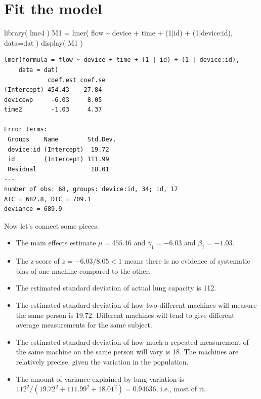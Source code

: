 \documentclass[
  letterpaper,
  DIV=11,
  numbers=noendperiod]{scrreprt}
\newenvironment{Shaded}{\begin{snugshade}}{\end{snugshade}}
\newcommand{\AttributeTok}[1]{\textcolor[rgb]{0.49,0.56,0.16}{#1}}
\newcommand{\DecValTok}[1]{\textcolor[rgb]{0.25,0.63,0.44}{#1}}
\newcommand{\FunctionTok}[1]{\textcolor[rgb]{0.02,0.16,0.49}{#1}}
\newcommand{\NormalTok}[1]{\textcolor[rgb]{0.00,0.44,0.13}{#1}}
\newcommand{\OtherTok}[1]{\textcolor[rgb]{0.00,0.44,0.13}{#1}}
\newcommand{\SpecialCharTok}[1]{\textcolor[rgb]{0.25,0.44,0.63}{#1}}
\providecommand{\tightlist}{%
  \setlength{\itemsep}{0pt}\setlength{\parskip}{0pt}}\usepackage{longtable,booktabs,array}
\begin{document}
\hypertarget{fit-the-model}{%
\section{Fit the model}\label{fit-the-model}}

\begin{Shaded}
\begin{Highlighting}[]
\FunctionTok{library}\NormalTok{( lme4 )}
\NormalTok{M1 }\OtherTok{=} \FunctionTok{lmer}\NormalTok{( flow }\SpecialCharTok{\textasciitilde{}}\NormalTok{ device }\SpecialCharTok{+}\NormalTok{ time }\SpecialCharTok{+}\NormalTok{ (}\DecValTok{1}\SpecialCharTok{|}\NormalTok{id) }\SpecialCharTok{+}\NormalTok{ (}\DecValTok{1}\SpecialCharTok{|}\NormalTok{device}\SpecialCharTok{:}\NormalTok{id), }\AttributeTok{data=}\NormalTok{dat )}
\FunctionTok{display}\NormalTok{( M1 )}
\end{Highlighting}
\end{Shaded}

\begin{verbatim}
lmer(formula = flow ~ device + time + (1 | id) + (1 | device:id), 
    data = dat)
            coef.est coef.se
(Intercept) 454.43    27.84 
devicewp     -6.03     8.05 
time2        -1.03     4.37 

Error terms:
 Groups    Name        Std.Dev.
 device:id (Intercept)  19.72  
 id        (Intercept) 111.99  
 Residual               18.01  
---
number of obs: 68, groups: device:id, 34; id, 17
AIC = 682.8, DIC = 709.1
deviance = 689.9 
\end{verbatim}

Now let's connect some pieces:

\begin{itemize}
\tightlist
\item
  The main effects estimate \(\mu = 455.46\) and \(\gamma_1 = -6.03\)
  and \(\beta_1 = -1.03\).
\item
  The z-score of \(z = -6.03 / 8.05 < 1\) means there is no evidence of
  systematic bias of one machine compared to the other.
\item
  The estimated standard deviation of actual lung capacity is 112.
\item
  The estimated standard deviation of how two different machines will
  measure the same person is \(19.72\). Different machines will tend to
  give different average measurements for the same subject.
\item
  The estimated standard deviation of how much a repeated measurement of
  the same machine on the same person will vary is 18. The machines are
  relatively precise, given the variation in the population.
\item
  The amount of variance explained by lung variation is
  \(112^2 / (19.72^2 + 111.99^2 + 18.01^2) = 0.94636\), i.e., most of
  it.
\end{itemize}
\end{document}
